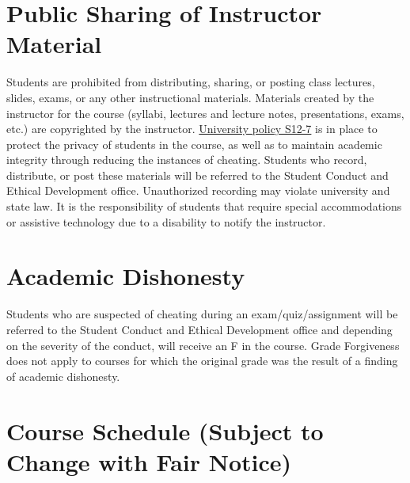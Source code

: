 \documentclass[11pt,]{article}
\begin{document}
\hypertarget{public-sharing-of-instructor-material}{%
\section{Public Sharing of Instructor
Material}\label{public-sharing-of-instructor-material}}

Students are prohibited from distributing, sharing, or posting class
lectures, slides, exams, or any other instructional materials. Materials
created by the instructor for the course (syllabi, lectures and lecture
notes, presentations, exams, etc.) are copyrighted by the instructor.
\href{https://www.sjsu.edu/senate/docs/S12-7.pdf}{University policy
S12-7} is in place to protect the privacy of students in the course, as
well as to maintain academic integrity through reducing the instances of
cheating. Students who record, distribute, or post these materials will
be referred to the Student Conduct and Ethical Development office.
Unauthorized recording may violate university and state law. It is the
responsibility of students that require special accommodations or
assistive technology due to a disability to notify the instructor.

\hypertarget{academic-dishonesty}{%
\section{Academic Dishonesty}\label{academic-dishonesty}}

Students who are suspected of cheating during an exam/quiz/assignment
will be referred to the Student Conduct and Ethical Development office
and depending on the severity of the conduct, will receive an F in the
course. Grade Forgiveness does not apply to courses for which the
original grade was the result of a finding of academic dishonesty.

\hypertarget{course-schedule-subject-to-change-with-fair-notice}{%
\section{Course Schedule (Subject to Change with Fair
Notice)}\label{course-schedule-subject-to-change-with-fair-notice}}
\end{document}
